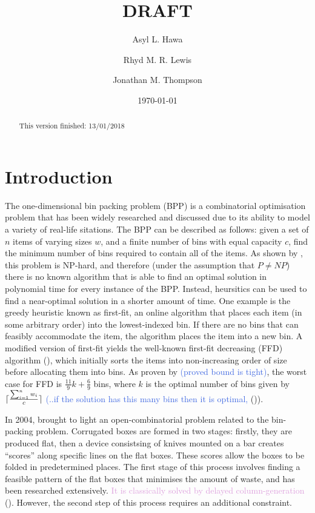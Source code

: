 \documentclass[oribibl]{llncs}
\title{DRAFT}
\author{Asyl L. Hawa \and Rhyd M. R. Lewis \and Jonathan M. Thompson}
\institute{School of Mathematics, Cardiff University, Senghennydd Road, Cardiff, UK, CF24 4AG}
\date{\today}
\begin{document}
\maketitle

\begin{abstract}
	This version finished: 13/01/2018
\end{abstract}


\section{Introduction}

The one-dimensional bin packing problem (BPP) is a combinatorial optimisation problem that has been widely researched and discussed due to its ability to model a variety of real-life sitations.
The BPP can be described as follows: given a set of $n$ items of varying sizes $w$, and a finite number of bins with equal capacity $c$, find the minimum number of bins required to contain all of the items. As shown by \cite{garey1979}, this problem is NP-hard, and therefore (under the assumption that $P \neq NP$) there is no known algorithm that is able to find an optimal solution in polynomial time for every instance of the BPP. Instead, heursitics can be used to find a near-optimal solution in a shorter amount of time. One example is the greedy heuristic known as first-fit, an online algorithm that places each item (in some arbitrary order) into the lowest-indexed bin. If there are no bins that can feasibly accommodate the item, the algorithm places the item into a new bin. A modified version of first-fit yields the well-known first-fit decreasing (FFD) algorithm (\citealp{eilon1971}), which initially sorts the items into non-increasing order of size before allocating them into bins. As proven by \cite{dosa2007} \textcolor{RoyalBlue}{(proved bound is tight)}, the worst case for FFD is $\frac{11}{9}k + \frac{6}{9}$ bins, where $k$ is the optimal number of bins given by $\lceil\frac{\sum_{i=1}^{n} w_{i}}{c}\rceil$ \textcolor{RoyalBlue}{(..if the solution has this many bins then it is optimal,} (\citealp{korf2002})).

In 2004, \citeauthor{goulimis2004} brought to light an open-combinatorial problem related to the bin-packing problem. Corrugated boxes are formed in two stages: firstly, they are produced flat, then a device consistsing of knives mounted on a bar creates ``scores'' along specific lines on the flat boxes. These scores allow the boxes to be folded in predetermined places. The first stage of this process involves finding a feasible pattern of the flat boxes that minimises the amount of waste, and has been researched extensively. \textcolor{Plum}{It is classically solved by delayed column-generation} (\citealp{gilmore1961, gilmore1963}). However, the second step of this process requires an additional constraint.
\end{document}
